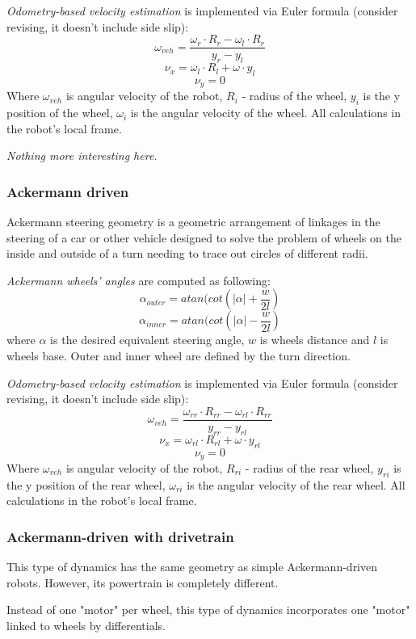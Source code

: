 \documentclass[a4paper,11pt]{article}
\begin{document}
\textit{Odometry-based velocity estimation} is implemented via Euler formula (consider revising, it doesn't include side slip):
\[
\omega_{veh} = \frac{\omega_r \cdot R_r - \omega_l \cdot R_r}{y_r - y_l}
\]
\[
\nu_x = \omega_l \cdot R_l + \omega \cdot y_l
\]
\[
\nu_y = 0
\]
Where $\omega_{veh}$ is angular velocity of the robot, $R_i$ - radius of the wheel, $y_i$ is the y position of the wheel, $\omega_i$ is the angular velocity of the wheel. All calculations in the robot's local frame.

\textit{Nothing more interesting here.}
\subsubsection{Ackermann driven}

Ackermann steering geometry is a geometric arrangement of linkages in the steering of a car or other vehicle designed to solve the problem of wheels on the inside and outside of a turn needing to trace out circles of different radii.

\textit{Ackermann wheels' angles }are computed as following:
\[
\alpha_{outer} = atan(cot(|\alpha| + \frac{w}{2l})
\]
\[
\alpha_{inner} = atan(cot(|\alpha| - \frac{w}{2l})
\]
where $\alpha$ is the desired equivalent steering angle, $w$ is wheels distance and $l$ is wheels base.
Outer and inner wheel are defined by the turn direction.



\textit{Odometry-based velocity estimation} is implemented via Euler formula (consider revising, it doesn't include side slip):
\[
\omega_{veh} = \frac{\omega_{rr} \cdot R_{rr} - \omega_{rl} \cdot R_{rr}}{y_{rr} - y_{rl}}
\]
\[
\nu_x = \omega_{rl} \cdot R_{rl} + \omega \cdot y_{rl}
\]
\[
\nu_y = 0
\]
Where $\omega_{veh}$ is angular velocity of the robot, $R_{ri}$ - radius of the rear wheel, $y_{ri}$ is the y position of the rear wheel, $\omega_{ri}$ is the angular velocity of the rear wheel. All calculations in the robot's local frame.


\subsubsection{Ackermann-driven with drivetrain} \label{sec:ackermann_drivetrain}

This type of dynamics has the same geometry as simple Ackermann-driven robots. However, its powertrain is completely different.

Instead of one "motor" per wheel, this type of dynamics incorporates one "motor" linked to wheels by differentials.
\end{document}

